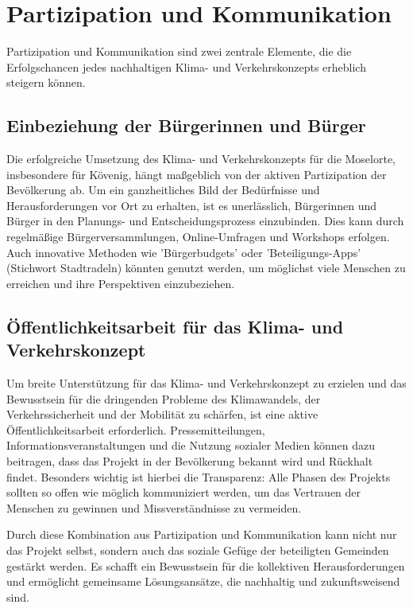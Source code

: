 \section{Partizipation und Kommunikation}
Partizipation und Kommunikation sind zwei zentrale Elemente, die die Erfolgschancen jedes nachhaltigen Klima- und Verkehrskonzepts erheblich steigern können. 
\subsection{Einbeziehung der Bürgerinnen und Bürger}
Die erfolgreiche Umsetzung des Klima- und Verkehrskonzepts für die Moselorte, insbesondere für Kövenig, hängt maßgeblich von der aktiven Partizipation der Bevölkerung ab. Um ein ganzheitliches Bild der Bedürfnisse und Herausforderungen vor Ort zu erhalten, ist es unerlässlich, Bürgerinnen und Bürger in den Planungs- und Entscheidungsprozess einzubinden. Dies kann durch regelmäßige Bürgerversammlungen, Online-Umfragen und Workshops erfolgen. Auch innovative Methoden wie 'Bürgerbudgets' oder 'Beteiligungs-Apps' (Stichwort Stadtradeln) könnten genutzt werden, um möglichst viele Menschen zu erreichen und ihre Perspektiven einzubeziehen.
\subsection{Öffentlichkeitsarbeit für das Klima- und Verkehrskonzept}
Um breite Unterstützung für das Klima- und Verkehrskonzept zu erzielen und das Bewusstsein für die dringenden Probleme des Klimawandels, der Verkehrssicherheit und der Mobilität zu schärfen, ist eine aktive Öffentlichkeitsarbeit erforderlich. Pressemitteilungen, Informationsveranstaltungen und die Nutzung sozialer Medien können dazu beitragen, dass das Projekt in der Bevölkerung bekannt wird und Rückhalt findet. Besonders wichtig ist hierbei die Transparenz: Alle Phasen des Projekts sollten so offen wie möglich kommuniziert werden, um das Vertrauen der Menschen zu gewinnen und Missverständnisse zu vermeiden.

Durch diese Kombination aus Partizipation und Kommunikation kann nicht nur das Projekt selbst, sondern auch das soziale Gefüge der beteiligten Gemeinden gestärkt werden. Es schafft ein Bewusstsein für die kollektiven Herausforderungen und ermöglicht gemeinsame Lösungsansätze, die nachhaltig und zukunftsweisend sind.